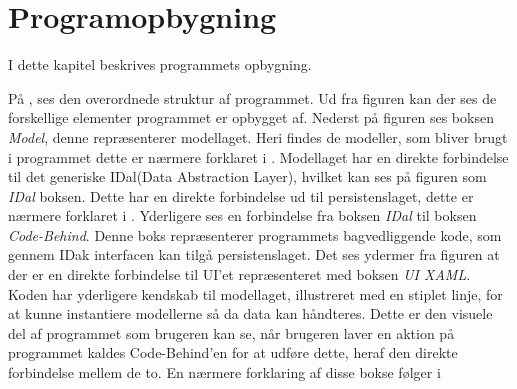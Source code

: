 \chapter{Programopbygning}

I dette kapitel beskrives programmets opbygning. 



På , ses den overordnede struktur af programmet. Ud fra figuren kan der ses de forskellige elementer programmet er opbygget af.
Nederst på figuren ses boksen \textit{Model}, denne repræsenterer modellaget.
Heri findes de modeller, som bliver brugt i programmet dette er nærmere forklaret i .
Modellaget har en direkte forbindelse til det generiske IDal(Data Abstraction Layer), hvilket kan ses på figuren som \textit{IDal} boksen.
Dette har en direkte forbindelse ud til persistenslaget, dette er nærmere forklaret i .
Yderligere ses en forbindelse fra boksen \textit{IDal} til boksen \textit{Code-Behind}. 
Denne boks repræsenterer programmets bagvedliggende kode, som gennem IDak interfacen kan tilgå persistenslaget. 
Det ses ydermer fra figuren at der er en direkte forbindelse til UI'et repræsenteret med boksen \textit{UI XAML}.
Koden har yderligere kendskab til modellaget, illustreret med en stiplet linje, for at kunne instantiere modellerne så da data kan håndteres.
Dette er den visuele del af programmet som brugeren kan se, når brugeren laver en aktion på programmet kaldes Code-Behind'en for at udføre dette, heraf den direkte forbindelse mellem de to. 
En nærmere forklaring af disse bokse følger i 
